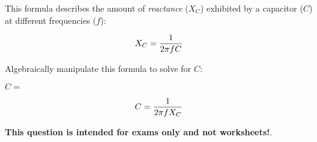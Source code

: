 

This formula describes the amount of {\it reactance} ($X_C$) exhibited by a capacitor ($C$) at different frequencies ($f$):

$$X_C = {1 \over {2 \pi f C}}$$

Algebraically manipulate this formula to solve for $C$:

\vskip 20pt

$C = $







$$C = {1 \over {2 \pi f X_C}}$$







{\bf This question is intended for exams only and not worksheets!}.



